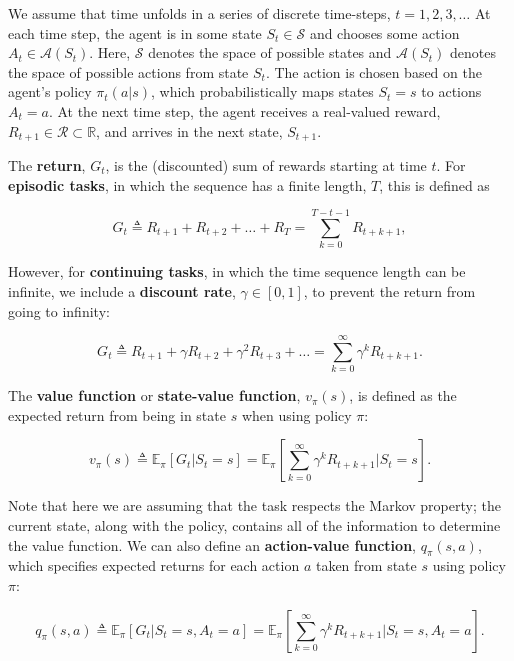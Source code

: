 We assume that time unfolds in a series of discrete time-steps, $t = 1, 2, 3, \dots$ At each time step, the agent is in some state $S_t \in \mathcal{S}$ and chooses some action $A_t \in \mathcal{A} (S_t)$. Here, $\mathcal{S}$ denotes the space of possible states and $\mathcal{A} (S_t)$ denotes the space of possible actions from state $S_t$. The action is chosen based on the agent's policy $\pi_t (a | s)$, which probabilistically maps states $S_t = s$ to actions $A_t = a$. At the next time step, the agent receives a real-valued reward, $R_{t+1} \in \mathcal{R} \subset \mathbb{R}$, and arrives in the next state, $S_{t+1}$.

The \textbf{return}, $G_t$, is the (discounted) sum of rewards starting at time $t$. For \textbf{episodic tasks}, in which the sequence has a finite length, $T$, this is defined as 

\begin{equation}
G_t \triangleq R_{t+1} + R_{t+2} + \dots + R_T = \sum_{k=0}^{T - t - 1} R_{t + k + 1},
\end{equation}

\noindent However, for \textbf{continuing tasks}, in which the time sequence length can be infinite, we include a \textbf{discount rate}, $\gamma \in [0, 1]$, to prevent the return from going to infinity:

\begin{equation}
G_t \triangleq R_{t+1} + \gamma R_{t+2} + \gamma^2 R_{t+3} + \dots = \sum_{k=0}^{\infty} \gamma^k R_{t + k + 1}.
\end{equation}

The \textbf{value function} or \textbf{state-value function}, $v_\pi (s)$, is defined as the expected return from being in state $s$ when using policy $\pi$:

\begin{equation}
	v_\pi (s) \triangleq \mathbb{E}_\pi \left[ G_t | S_t = s \right] = \mathbb{E}_\pi \left[ \sum_{k=0}^{\infty} \gamma^k R_{t + k + 1} | S_t = s \right].
	\label{eq: value_func_def}
\end{equation}

\noindent Note that here we are assuming that the task respects the Markov property; the current state, along with the policy, contains all of the information to determine the value function. We can also define an \textbf{action-value function}, $q_\pi (s, a)$, which specifies expected returns for each action $a$ taken from state $s$ using policy $\pi$:

\begin{equation}
	q_\pi (s, a) \triangleq \mathbb{E}_\pi \left[ G_t | S_t = s, A_t = a \right] = \mathbb{E}_\pi \left[ \sum_{k=0}^{\infty} \gamma^k R_{t + k + 1} | S_t = s, A_t = a \right].
\end{equation}

